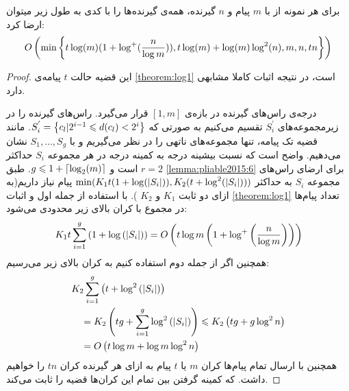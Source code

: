 \begin{theorem}
    \cite{pliable2015paper}
    \label{thm:pliable2015_7}
    برای هر نمونه از
    با
    $m$
    پیام و
    $n$
    گیرنده، همه‌ی گیرنده‌ها را با کدی به طول زیر میتوان ارضا کرد:
    \begin{equation}
        O\left( \min\left\{  t \log(m) (1 + \log^{+}(\dfrac{n}{\log m})), t \log(m) + \log(m) \log^2(n), m, n, tn \right\}\right)
    \end{equation}
\end{theorem}
\begin{proof}
    این قضیه حالت
    $t$
    پیامه‌ی
    \autoref{theorem:log1}
    است، در نتیجه اثبات کاملا مشابهی دارد.

    درجه‌ی راس‌های گیرنده در بازه‌ی
    $[1, m]$
    قرار می‌گیرد. راس‌های گیرنده را در زیرمجموعه‌های
    $S_i^{'}$
    تقسیم می‌کنیم به صورتی که
    $S_i^{'} = \left\{ c_l | 2^{i - 1} \leqslant d(c_l) < 2^i  \right\}$. مانند قضیه تک پیامه، تنها مجموعه‌های ناتهی را در نظر می‌گیریم و با
    $S_1, \ldots, S_g$
    نشان می‌دهیم. واضح است که نسبت بیشینه درجه به کمینه درجه در هر مجموعه
    $S_i$
    حداکثر
    $r = 2$
    است و
    $g \leqslant 1 + \left\lceil{\log_2(m)}\right\rceil$. طبق
    \autoref{lemma:pliable2015:6}
    برای ارضای راس‌های مجموعه‌
    $S_i$
    به حداکثر
    $\min (K_1 t (1 + \log(\left|{S_i}\right|)), K_2(t + \log^2(\left|{S_i}\right|)))$
    پیام نیاز داریم(به ازای دو ثابت
    $K_1$
    و
    $K_2$
    ). با استفاده از جمله اول و اثبات
    \autoref{theorem:log1}
    تعداد پیام‌ها در مجموع با کران بالای زیر محدودی می‌شود:
    $$
    K_1 t \sum_{i=1}^g\left(1+\log \left(\left|{S_i}\right|\right)\right)=O\left(t \log m\left(1+\log ^{+}\left(\frac{n}{\log m}\right)\right)\right)
    $$
    همچنین اگر از جمله دوم استفاده کنیم به کران بالای زیر می‌رسیم:
    $$
    \begin{aligned}
        & K_2 \sum_{i=1}^g\left(t+\log ^2\left(\left|{S_i}\right|\right)\right) \\
        & \quad=K_2\left(t g+\sum_{i=1}^g \log ^2\left(\left|{S_i}\right|\right)\right) \leqslant K_2\left(t g+g \log ^2 n\right) \\
        & \quad=O\left(t \log m+\log m \log ^2 n\right)
    \end{aligned}
    $$
    همچنین با ارسال تمام پیام‌ها کران $m$ یا $t$ پیام به ازای هر گیرنده کران $tn$ را خواهیم داشت. که کمینه گرفتن بین تمام این کران‌ها قضیه را ثابت می‌کند.
\end{proof}


